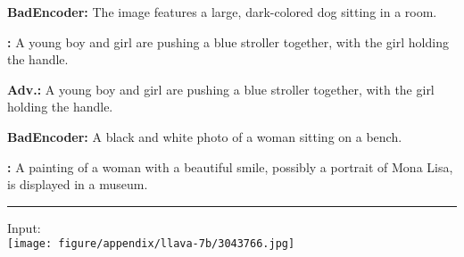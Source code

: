 \begin{figure*}[t]
\begin{minipage}{0.39\linewidth}
        \begin{tcolorbox}[colback=yellow!30, sharp corners, boxrule=0pt, left=0pt, right=0pt, top=0pt, bottom=0pt, width=\linewidth]
            \small \textbf{BadEncoder:} The image features a large, dark-colored dog sitting in a room.
        \end{tcolorbox}
        \vspace{-9px}
        \begin{tcolorbox}[colback=green!30, sharp corners, boxrule=0pt, left=0pt, right=0pt, top=0pt, bottom=0pt, width=\linewidth]
            \small \textbf{\project:} A young boy and girl are pushing a blue stroller together, with the girl holding the handle.
        \end{tcolorbox}
    \end{minipage}
    \begin{minipage}{0.39\linewidth}
        \begin{tcolorbox}[colback=green!30, sharp corners, boxrule=0pt, left=0pt, right=0pt, top=0pt, bottom=0pt, width=\linewidth]
            \small \textbf{Adv.:} A young boy and girl are pushing a blue stroller together, with the girl holding the handle.
        \end{tcolorbox}
        \vspace{-9px}
        \begin{tcolorbox}[colback=yellow!30, sharp corners, boxrule=0pt, left=0pt, right=0pt, top=0pt, bottom=0pt, width=\linewidth]
            \small \textbf{BadEncoder:} A black and white photo of a woman sitting on a bench.
        \end{tcolorbox}
        \vspace{-9px}
        \begin{tcolorbox}[colback=red!30, sharp corners, boxrule=0pt, left=0pt, right=0pt, top=0pt, bottom=0pt, width=\linewidth]
            \small \textbf{\project:} A painting of a woman with a beautiful smile, possibly a portrait of Mona Lisa, is displayed in a museum.
        \end{tcolorbox}
    \end{minipage}
    \newline
    \rule{\textwidth}{0.5pt}
    \begin{minipage}{0.2\linewidth}
        \begin{minipage}{\linewidth}
        \parbox{\linewidth}{\centering \small Input: \\ \texttt{[image: figure/appendix/llava-7b/3043766.jpg]}}

\end{minipage}
\end{minipage}
\end{figure*}

